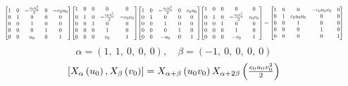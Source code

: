\documentclass[11pt]{article}
\theoremstyle{definition}
\begin{document}
\[
\scaletoalign{\textwidth}{{\left[\begin{matrix}1 & 0 & - \frac{c_{0} u_{0}^{2}}{2} & 0 & - c_{0} u_{0}\\0 & 1 & 0 & 0 & 0\\0 & 0 & 1 & 0 & 0\\0 & 0 & 0 & 1 & 0\\0 & 0 & u_{0} & 0 & 1\end{matrix}\right]} {\left[\begin{matrix}1 & 0 & 0 & 0 & 0\\0 & 1 & 0 & - \frac{c_{0} v_{0}^{2}}{2} & - c_{0} v_{0}\\0 & 0 & 1 & 0 & 0\\0 & 0 & 0 & 1 & 0\\0 & 0 & 0 & v_{0} & 1\end{matrix}\right]} {\left[\begin{matrix}1 & 0 & - \frac{c_{0} u_{0}^{2}}{2} & 0 & c_{0} u_{0}\\0 & 1 & 0 & 0 & 0\\0 & 0 & 1 & 0 & 0\\0 & 0 & 0 & 1 & 0\\0 & 0 & - u_{0} & 0 & 1\end{matrix}\right]} {\left[\begin{matrix}1 & 0 & 0 & 0 & 0\\0 & 1 & 0 & - \frac{c_{0} v_{0}^{2}}{2} & c_{0} v_{0}\\0 & 0 & 1 & 0 & 0\\0 & 0 & 0 & 1 & 0\\0 & 0 & 0 & - v_{0} & 1\end{matrix}\right]} = {\left[\begin{matrix}1 & 0 & 0 & - c_{0} u_{0} v_{0} & 0\\0 & 1 & c_{0} u_{0} v_{0} & 0 & 0\\0 & 0 & 1 & 0 & 0\\0 & 0 & 0 & 1 & 0\\0 & 0 & 0 & 0 & 1\end{matrix}\right]}}
\]
\[
\alpha = \left( 1, \  1, \  0, \  0, \  0\right), \quad \beta = \left( -1, \  0, \  0, \  0, \  0\right)
\]
\[
\scaletoalign{\textwidth}{\left[ X_{\alpha}\left(u_{0}\right), X_{\beta}\left(v_{0}\right) \right] = X_{\alpha + \beta}\left(u_{0} v_{0}\right) X_{\alpha + 2\beta}\left(\frac{c_{0} u_{0} v_{0}^{2}}{2}\right)}
\]
\end{document}
